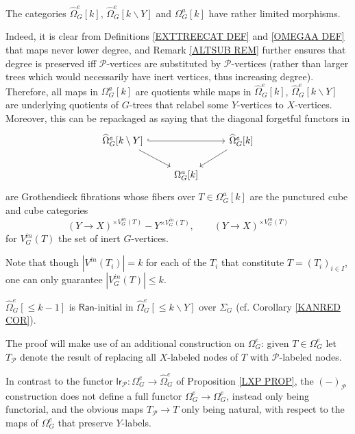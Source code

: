 \documentclass[a4paper,10pt]{article}%
\begin{document}
\begin{remark}\label{LIMMOR REM}
  The categories 
  $\widehat{\Omega}_G^e[k]$, $\widehat{\Omega}_G^e[k \mathbin{\backslash} Y]$ and $\Omega_G^a[k]$
  have rather limited morphisms.
  
Indeed, it is clear from Definitions 
\ref{EXTTREECAT DEF} and \ref{OMEGAA DEF} 
that maps never lower degree,
and Remark \ref{ALTSUB REM} further ensures that degree is preserved iff
$\mathcal{P}$-vertices are substituted by $\mathcal{P}$-vertices (rather than larger trees
which would necessarily have inert vertices, thus increasing degree).
Therefore, all maps in $\Omega_G^a[k]$ are quotients while maps in $\widehat{\Omega}_G^e[k]$, $\widehat{\Omega}_G^e[k \mathbin{\backslash} Y]$
are underlying quotients of $G$-trees that 
relabel some $Y$-vertices to $X$-vertices.  
 Moreover, this can be repackaged as saying that 
  the diagonal forgetful functors in
\[
\begin{tikzcd}
  \widehat\Omega_G^e[k \mathbin{\backslash} Y] \arrow[dr] \arrow[rr, hookrightarrow] 
  && \widehat\Omega_G^e[k] \arrow[dl]\\
  & \Omega_G^a[k]
\end{tikzcd}
\]  
 are Grothendieck fibrations whose fibers over 
 $T \in \Omega_G^a[k]$
 are the punctured cube and cube categories
\[
	(Y \to X)^{\times V_G^{in}(T)} - Y^{\times  V_G^{in}(T)},
\qquad
	(Y \to X)^{\times V_G^{in}(T)}
\]
for $V_G^{in}(T)$ the set of inert $G$-vertices.

Note that though 
$|V^{in}(T_i)| = k$
for each of the $T_i$ that constitute $T=(T_i)_{i \in I}$,
one can only guarantee $|V_G^{in}(T)| \leq k$.
\end{remark}


\begin{lemma}\label{MINUS_LAN_FINAL_LEMMA}
  $\widehat{\Omega}_G^e[\leq\! k-1]$ is $\mathsf{Ran}$-initial in $\widehat{\Omega}_G^{e}[\leq\! k \mathbin{\backslash} Y]$ over $\Sigma_G$ (cf. Corollary \ref{KANRED COR}).
\end{lemma}

The proof will make use of an additional  construction on 
$\Omega_{G}^e$: given $T \in \Omega_{G}^e$ let $T_{\mathcal{P}}$ denote the result of replacing all $X$-labeled nodes of $T$ with $\mathcal{P}$-labeled nodes.

\begin{remark}\label{YINERT REM}
	In contrast to the functor
	$\mathsf{lr}_{\mathcal{P}} \colon
	\Omega_G^e \to \widehat{\Omega}_G^e $
	of Proposition \ref{LXP PROP},
	the $(\minus)_{\mathcal{P}}$ construction 
	does not define a full functor
        $\Omega_G^e \to \Omega_G^e$, instead only being functorial, and the obvious maps $T_{\mathcal{P}} \to T$ only being natural,
        with respect to the
        maps of $\Omega_G^e$ that preserve $Y$-labels.
\end{remark}
\end{document}
